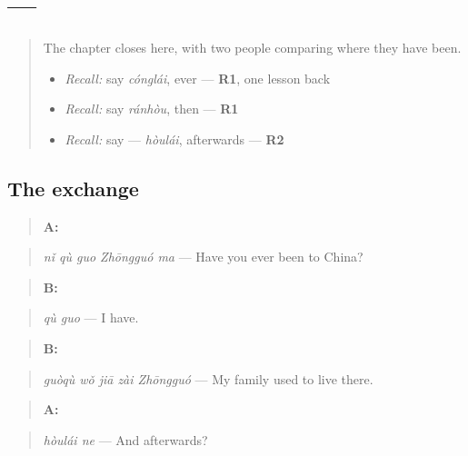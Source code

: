 \section[Practice]{ — }

\label{lesson:ZH-C150-practice}



\begin{quote}
The chapter closes here, with two people comparing where they have been.

\begin{itemize}
\raggedright
  \item \emph{Recall:} say \emph{cónglái}, ever — \textbf{R1}, one lesson back
  \item \emph{Recall:} say \emph{ránhòu}, then — \textbf{R1}
  \item \emph{Recall:} say  — \emph{hòulái}, afterwards — \textbf{R2}
\end{itemize}
\end{quote}

\subsection*{The exchange}
\begin{quote}
\textbf{A:} 
\end{quote}

\begin{quote}
\emph{nǐ qù guo Zhōngguó ma} — Have you ever been to China?
\end{quote}

\begin{quote}
\textbf{B:} 
\end{quote}

\begin{quote}
\emph{qù guo} — I have.
\end{quote}

\begin{quote}
\textbf{B:} 
\end{quote}

\begin{quote}
\emph{guòqù wǒ jiā zài Zhōngguó} — My family used to live there.
\end{quote}

\begin{quote}
\textbf{A:} 
\end{quote}

\begin{quote}
\emph{hòulái ne} — And afterwards?
\end{quote}

